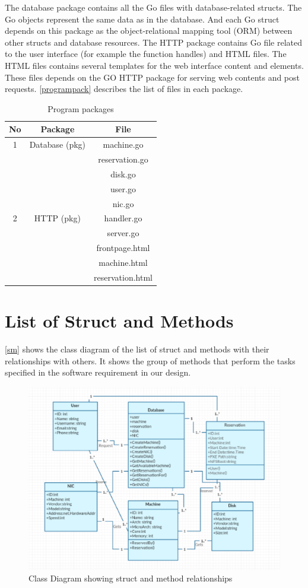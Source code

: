 The database package contains all the Go files with database-related structs. The Go objects represent the same data as in the database. And each Go struct depends on this package as the object-relational mapping tool (ORM) between other structs and database resources. The HTTP package contains Go file related to the user interface (for example the function handles) and HTML files. The HTML files contains several templates for the web interface content and elements. These files depends on the GO HTTP package for serving web contents and post requests. \autoref{programpack} describes the list of files in each package.
\pagebreak
\begin{table}[h!]
  \centering
  \begin{tabular}{ccc}
    \hline
    No & Package & File\\
   \hline
    1 &Database (pkg)& machine.go\\
       &&reservation.go\\
      &&disk.go\\
      &&user.go\\
      &&nic.go\\
    \hline
    2 &HTTP (pkg)& handler.go\\
    &&server.go\\
    &&frontpage.html\\
    &&machine.html\\
    &&reservation.html\\
    \hline
  \end{tabular}
  \caption{Program packages}
  \label{programpack}
\end{table}

\section{List of Struct and Methods}
\autoref{sm} shows the class diagram of the list of struct and methods with their relationships with others. It shows the group of methods that perform the tasks specified in the software requirement in our design.
\begin{figure}[h!]
\includegraphics[width = \linewidth]{methods.eps}
\caption{Class Diagram showing struct and method relationships}
\label{sm} 
\end{figure}
\pagebreak

